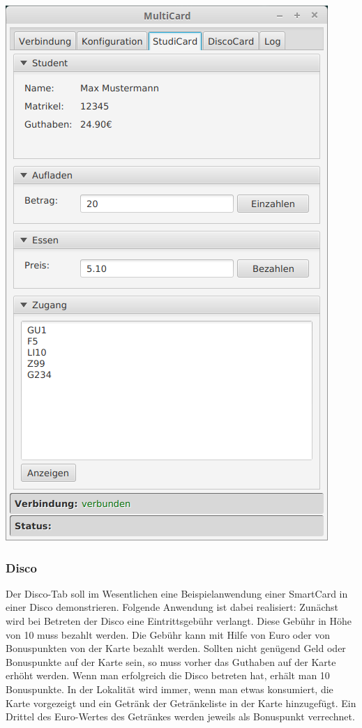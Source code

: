 \begin{center}
	\includegraphics[scale=0.4]{Images/StudiCardTab}
\end{center}


\subsubsection{Disco}
Der Disco-Tab soll im Wesentlichen eine Beispielanwendung einer SmartCard in einer Disco demonstrieren.
Folgende Anwendung ist dabei realisiert:
Zunächst wird bei Betreten der Disco eine Eintrittsgebühr verlangt.
Diese Gebühr in Höhe von 10\texteuro{} muss bezahlt werden.
Die Gebühr kann mit Hilfe von Euro oder von Bonuspunkten von der Karte bezahlt werden.
Sollten nicht genügend Geld oder Bonuspunkte auf der Karte sein, so muss vorher das Guthaben auf der Karte erhöht werden.
Wenn man erfolgreich die Disco betreten hat, erhält man 10 Bonuspunkte.
In der Lokalität wird immer, wenn man etwas konsumiert, die Karte vorgezeigt und ein Getränk der Getränkeliste in der Karte hinzugefügt.
Ein Drittel des Euro-Wertes des Getränkes werden jeweils als Bonuspunkt verrechnet.


